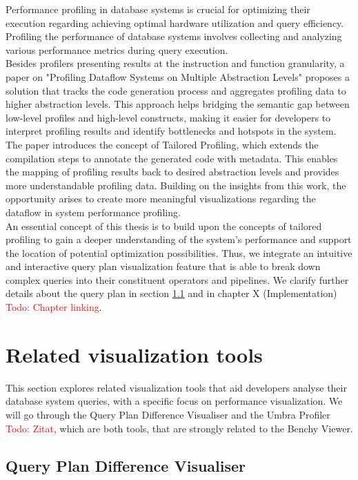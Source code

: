 Performance profiling in database systems is crucial for optimizing their execution regarding achieving optimal hardware utilization and query efficiency.
Profiling the performance of database systems involves collecting and analyzing various performance metrics during query execution.
\\Besides profilers presenting results at the instruction and function granularity, a paper on "Profiling Dataflow Systems on Multiple Abstraction Levels" \cite{profiling-dataflow} proposes a solution that tracks the code generation process and aggregates profiling data to higher abstraction levels. This approach helps bridging the semantic gap between low-level profiles and high-level constructs, making it easier for developers to interpret profiling results and identify bottlenecks and hotspots in the system. The paper introduces the concept of Tailored Profiling, which extends the compilation steps to annotate the generated code with metadata. This enables the mapping of profiling results back to desired abstraction levels and provides more understandable profiling data.
Building on the insights from this work, the opportunity arises to create more meaningful visualizations regarding the dataflow in system performance profiling.
\\ An essential concept of this thesis is to build upon the concepts of tailored profiling to gain a deeper understanding of the system's performance and support the location of potential optimization possibilities. Thus, we integrate an intuitive and interactive query plan visualization feature that is able to break down complex queries into their constituent operators and pipelines. We clarify further details about the query plan in section \ref{subsec:semantic-diff} and in chapter X (Implementation) \textcolor{red}{Todo: Chapter linking}.

\section{Related visualization tools}

This section explores related visualization tools that aid developers analyse their database system queries, with a specific focus on performance visualization. We will go through the Query Plan Difference Visualiser and the Umbra Profiler \textcolor{red}{Todo: Zitat}, which are both tools, that are strongly related to the Benchy Viewer. 


\subsection{Query Plan Difference Visualiser}
\label{subsec:semantic-diff}

